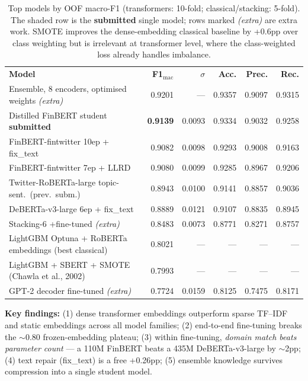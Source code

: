 \documentclass[11pt,a4paper]{article}
\newcommand{\tH}[1]{\textcolor{maincolor}{\textbf{#1}}}
\newcommand{\gmid}{\arrayrulecolor{maincolor}\midrule\arrayrulecolor{black}}
\newcommand{\distf}{0.9139}    %
\newcommand{\distacc}{0.9334}  %
\begin{document}
\begin{table}[H]
  \centering
  \footnotesize
  \setlength{\tabcolsep}{5pt}
  \begin{tabularx}{\linewidth}{@{}>{\raggedright\arraybackslash}X r r r r r@{}}
    \toprule
    \tH{Model} & \tH{F1$_{\text{mac}}$} & \tH{$\sigma$} & \tH{Acc.} & \tH{Prec.} & \tH{Rec.} \\
    \gmid
    Ensemble, 8 encoders, optimised weights \emph{(extra)} & 0.9201 & --- & 0.9357 & 0.9097 & 0.9315 \\
    \rowcolor{lightgray} Distilled FinBERT student \textbar{} \textbf{submitted} & \textbf{\distf} & 0.0093 & \distacc & 0.9032 & 0.9258 \\
    FinBERT-fintwitter 10ep + fix\_text                 & 0.9082 & 0.0098 & 0.9293 & 0.9008 & 0.9163 \\
    FinBERT-fintwitter 7ep + LLRD                       & 0.9080 & 0.0099 & 0.9285 & 0.8967 & 0.9206 \\
    Twitter-RoBERTa-large topic-sent.\ (prev.\ subm.)   & 0.8943 & 0.0100 & 0.9141 & 0.8857 & 0.9036 \\
    DeBERTa-v3-large 6ep + fix\_text                    & 0.8889 & 0.0121 & 0.9107 & 0.8835 & 0.8945 \\
    Stacking-6 \textbar{} +fine-tuned \emph{(extra)}    & 0.8483 & 0.0073 & 0.8771 & 0.8271 & 0.8757 \\
    LightGBM Optuna + RoBERTa embeddings (best classical) & 0.8021 & --- & --- & --- & --- \\
    LightGBM + SBERT + SMOTE (Chawla et al., 2002)      & 0.7993 & --- & --- & --- & --- \\
    GPT-2 decoder fine-tuned \emph{(extra)}             & 0.7724 & 0.0159 & 0.8125 & 0.7475 & 0.8171 \\
    \bottomrule
  \end{tabularx}
  \caption{Top models by OOF macro-F1 (transformers: 10-fold; classical/stacking: 5-fold). The
  shaded row is the \textbf{submitted} single model; rows marked \emph{(extra)} are extra work.
  SMOTE improves the dense-embedding classical baseline by +0.6pp over class weighting but is
  irrelevant at transformer level, where the class-weighted loss already handles imbalance.}
  \label{tab:results}
\end{table}

\textbf{Key findings:} (1) dense transformer embeddings outperform sparse TF--IDF and static
embeddings across all model families; (2) end-to-end fine-tuning breaks the $\sim$0.80
frozen-embedding plateau; (3) within fine-tuning, \emph{domain match beats parameter count} ---
a 110M FinBERT beats a 435M DeBERTa-v3-large by $\sim$2pp; (4) text repair (fix\_text) is a free
+0.26pp; (5) ensemble knowledge survives compression into a single student model.
\end{document}
